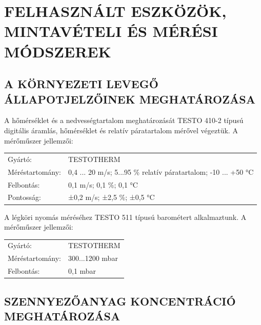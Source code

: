 \documentclass[a4paper,12pt]{article}
\begin{document}
	
	\newpage
	\section{FELHASZNÁLT ESZKÖZÖK, MINTAVÉTELI ÉS MÉRÉSI MÓDSZEREK}
	\subsection{A KÖRNYEZETI LEVEGŐ ÁLLAPOTJELZŐINEK MEGHATÁROZÁSA}

		\begin{adjustwidth}{1cm}{0cm}

	\vspace{1.0em}	A hőmérséklet és a nedvességtartalom meghatározását TESTO 410-2 típusú digitális áramlás, hőmérséklet és relatív páratartalom mérővel végeztük. A mérőműszer jellemzői:

	\vspace{1.0em}	\noindent
	\centering
	\begin{tabular}{ p{5.5cm} p{8cm} }
		Gyártó: & TESTOTHERM \\
		Méréstartomány: & 0,4 ... 20 m/s; 5...95 \% relatív páratartalom; -10 ... +50 °C \\
		Felbontás: & 0,1 m/s; 0,1 \%; 0,1 °C \\
		Pontosság: & ±0,2 m/s; ±2,5 \%; ±0,5 °C \\
	\end{tabular}
\end{adjustwidth}
\begin{adjustwidth}{1cm}{0cm}

	\vspace{1.0em}	A légköri nyomás méréséhez TESTO 511 típusú barométert alkalmaztunk. A mérőműszer jellemzői:

	\vspace{1.0em}	\noindent
	\centering
	\begin{tabular}{ p{5.5cm} p{8cm} }
		Gyártó: & TESTOTHERM \\
		Méréstartomány: & 300...1200 mbar \\
		Felbontás: & 0,1 mbar \\
	\end{tabular}
\end{adjustwidth}


	\subsection{SZENNYEZŐANYAG KONCENTRÁCIÓ MEGHATÁROZÁSA}
	
\end{document}
